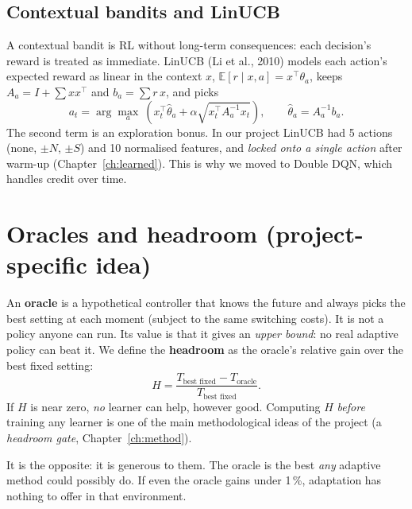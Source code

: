 \subsection{Contextual bandits and LinUCB}
A contextual bandit is RL without long-term consequences: each decision's reward is treated as immediate. LinUCB (Li et al., 2010) models each action's expected reward as linear in the context $x$, $\mathbb{E}[r\mid x,a] = x^\top\theta_a$, keeps $A_a = I + \sum x x^\top$ and $b_a = \sum r\,x$, and picks
\begin{equation}
a_t = \arg\max_a\ \left( x_t^\top \hat\theta_a + \alpha\sqrt{x_t^\top A_a^{-1} x_t}\right), \qquad \hat\theta_a = A_a^{-1}b_a .
\end{equation}
The second term is an exploration bonus. In our project LinUCB had 5 actions (none, $\pm N$, $\pm S$) and 10 normalised features, and \emph{locked onto a single action} after warm-up (Chapter~\ref{ch:learned}). This is why we moved to Double DQN, which handles credit over time.

\section{Oracles and headroom (project-specific idea)}
An \textbf{oracle} is a hypothetical controller that knows the future and always picks the best setting at each moment (subject to the same switching costs). It is not a policy anyone can run. Its value is that it gives an \emph{upper bound}: no real adaptive policy can beat it. We define the \textbf{headroom} as the oracle's relative gain over the best fixed setting:
\begin{equation}
H = \frac{T_{\text{best fixed}} - T_{\text{oracle}}}{T_{\text{best fixed}}}.
\end{equation}
If $H$ is near zero, \emph{no} learner can help, however good. Computing $H$ \emph{before} training any learner is one of the main methodological ideas of the project (a \emph{headroom gate}, Chapter~\ref{ch:method}).

\begin{doubt}
It is the opposite: it is generous to them. The oracle is the best \emph{any} adaptive method could possibly do. If even the oracle gains under 1\,\%, adaptation has nothing to offer in that environment.
\end{doubt}

